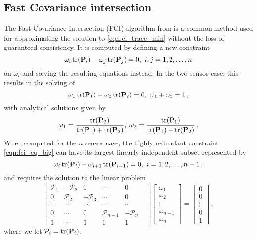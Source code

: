 \documentclass[letterpaper, 10 pt, conference]{ieeeconf}  %
\begin{document}
\subsection{Fast Covariance intersection}
The Fast Covariance Intersection (FCI) algorithm from \cite{niehsenInformationFusionBased2002} is a common method used for approximating the solution to \eqref{eqn:ci_trace_min} without the loss of guaranteed consistency. It is computed by defining a new constraint
\begin{equation}
   \omega_i \operatorname{tr}({{\mathbf{P}}}_i) - \omega_j \operatorname{tr}({{\mathbf{P}}}_j) = 0,\ i,j=1,2,\dots,n \label{eqn:fci_eq_big}
\end{equation}
on $\omega_i$ and solving the resulting equations instead. In the two sensor case, this results in the solving of
\begin{equation}
   \omega_1 \operatorname{tr}({{\mathbf{P}}}_1) - \omega_2 \operatorname{tr}({{\mathbf{P}}}_2) = 0,\ \omega_1 + \omega_2 = 1\,, \label{eqn:fci_2sen_omega_sum_eq}
\end{equation}
with analytical solutions given by
\begin{equation}
   \omega_1 = \frac{\operatorname{tr}({{\mathbf{P}}}_2)}{\operatorname{tr}({{\mathbf{P}}}_1)+\operatorname{tr}({{\mathbf{P}}}_2)},\ \omega_2 = \frac{\operatorname{tr}({{\mathbf{P}}}_1)}{\operatorname{tr}({{\mathbf{P}}}_1)+\operatorname{tr}({{\mathbf{P}}}_2)}\,. \label{eqn:fci_2sen_sol}
\end{equation}
When computed for the $n$ sensor case, the highly redundant constraint \eqref{eqn:fci_eq_big} can have its largest linearly independent subset represented by
\begin{equation}
   \omega_i \operatorname{tr}({{\mathbf{P}}}_i) - \omega_{i+1} \operatorname{tr}({{\mathbf{P}}}_{i+1}) = 0,\ i=1,2,\dots,n-1\,, \label{eqn:fci_eq}
\end{equation}
and requires the solution to the linear problem
\begin{equation}
   \begin{bmatrix}
      \mathcal{P}_1 & -\mathcal{P}_2 & 0 & \cdots & 0 \\
      0 & \mathcal{P}_2 & -\mathcal{P}_3 & \cdots & 0 \\
      \cdots & \cdots & \cdots & \cdots & \cdots & \\
      0 & \cdots & 0 & \mathcal{P}_{n-1} & -\mathcal{P}_{n} \\
      1 & \cdots & 1 & 1 & 1 &
   \end{bmatrix}
   \begin{bmatrix}
      \omega_1 \\
      \omega_2 \\
      \vdots \\
      \omega_{n-1} \\
      \omega_{n}
   \end{bmatrix}
   =
   \begin{bmatrix}
      0 \\
      0 \\
      \vdots \\
      0 \\
      1
   \end{bmatrix}\,, \label{eqn:fci_eq_sys}
\end{equation}
where we let $\mathcal{P}_i = \operatorname{tr}({{\mathbf{P}}}_i)$.
\end{document}
